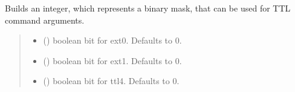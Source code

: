 \documentclass[letterpaper,10pt,english]{sphinxmanual}
\begin{document}
\begin{fulllineitems}
\begin{fulllineitems}
\label{\detokenize{PodApi.Devices:PodApi.Devices.PodDevice_8401HR.Pod8401HR.GetTTLbitmask}}
\pysigstartsignatures
{}
\pysigstopsignatures
\sphinxAtStartPar
Builds an integer, which represents a binary mask, that can be used for TTL command arguments.
\begin{quote}\begin{description}
\begin{itemize}
\item {} 
\sphinxAtStartPar
{} (\sphinxstyleliteralemphasis{\sphinxupquote{, }}) \textendash{} boolean bit for ext0. Defaults to 0.

\item {} 
\sphinxAtStartPar
{} (\sphinxstyleliteralemphasis{\sphinxupquote{, }}) \textendash{} boolean bit for ext1. Defaults to 0.

\item {} 
\sphinxAtStartPar
{} (\sphinxstyleliteralemphasis{\sphinxupquote{, }}) \textendash{} boolean bit for ttl4. Defaults to 0.


\end{itemize}
\end{description}
\end{quote}
\end{fulllineitems}
\end{fulllineitems}
\end{document}
